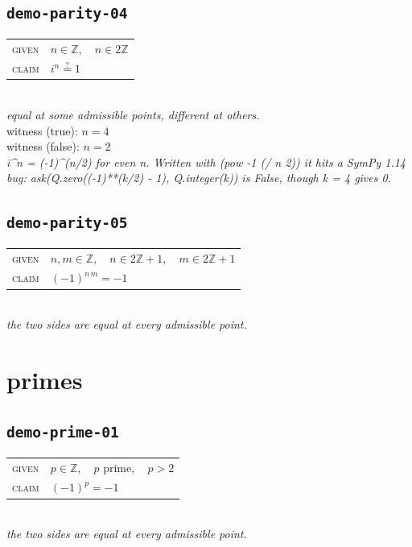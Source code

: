 \documentclass[11pt]{article}
\begin{document}
\subsection*{\texttt{demo-parity-04}}
\begin{tabular}{@{}l@{\quad}l@{}}
\textsc{given} & $n \in \mathbb{Z},\quad n \in 2\mathbb{Z}$ \\[4pt]
\textsc{claim} & $\displaystyle i^{n} \overset{?}{=} 1$ \\
\end{tabular}\\[2pt]
{\small\emph{equal at some admissible points, different at others.}}\\
{\footnotesize\color{gray}witness (true): $n = 4$}\\
{\footnotesize\color{gray}witness (false): $n = 2$}\\
\emph{i\textasciicircum{}n = (-1)\textasciicircum{}(n/2) for even n.  Written with (pow -1 (/ n 2)) it hits a SymPy 1.14 bug: ask(Q.zero((-1)**(k/2) - 1), Q.integer(k)) is False, though k = 4 gives 0.}\\

\subsection*{\texttt{demo-parity-05}}
\begin{tabular}{@{}l@{\quad}l@{}}
\textsc{given} & $n, m \in \mathbb{Z},\quad n \in 2\mathbb{Z} + 1,\quad m \in 2\mathbb{Z} + 1$ \\[4pt]
\textsc{claim} & $\displaystyle \left(-1\right)^{n \, m} = -1$ \\
\end{tabular}\\[2pt]
{\small\emph{the two sides are equal at every admissible point.}}\\

\section*{primes}
\subsection*{\texttt{demo-prime-01}}
\begin{tabular}{@{}l@{\quad}l@{}}
\textsc{given} & $p \in \mathbb{Z},\quad p \text{ prime},\quad p > 2$ \\[4pt]
\textsc{claim} & $\displaystyle \left(-1\right)^{p} = -1$ \\
\end{tabular}\\[2pt]
{\small\emph{the two sides are equal at every admissible point.}}\\
\end{document}
